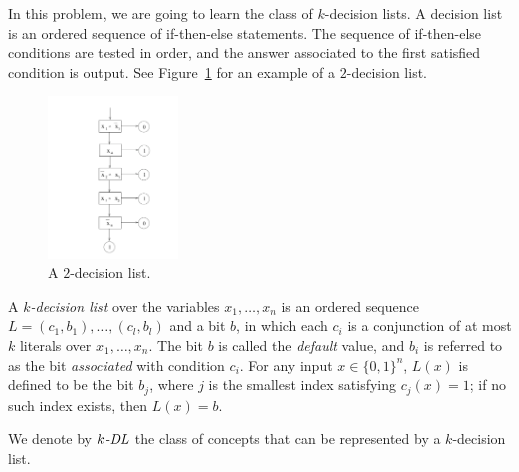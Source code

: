 In this problem, we are going to learn the class of $k$-decision
lists. A decision list is an ordered sequence of if-then-else
statements. The sequence of if-then-else conditions are tested in
order, and the answer associated to the first satisfied condition is
output. See Figure~\ref{fig:decision_list} for an example of a
$2$-decision list.

\begin{figure}[h]
\begin{center}
\includegraphics[width=1.35in]{auto/figure.png}
\caption{A $2$-decision list.}
\label{fig:decision_list}
\end{center}
\end{figure}

A {\em $k$-decision list} over the variables $x_{1}, \ldots, x_{n}$ is
an ordered sequence $L=(c_{1}, b_{1}), \ldots, (c_{l},b_{l})$ and a
bit $b$, in which each $c_{i}$ is a conjunction of at most $k$
literals over $x_{1},\ldots, x_{n}$. The bit $b$ is called the {\em
  default} value, and $b_{i}$ is referred to as the bit {\em
  associated} with condition $c_{i}$. For any input $x \in \{0,
1\}^{n}$, $L(x)$ is defined to be the bit $b_{j}$, where $j$ is the
smallest index satisfying $c_{j}(x)=1$; if no such index exists, then
$L(x)=b$.

We denote by $k\mbox{\em -DL}$ the class of concepts that can be
represented by a $k$-decision list.


